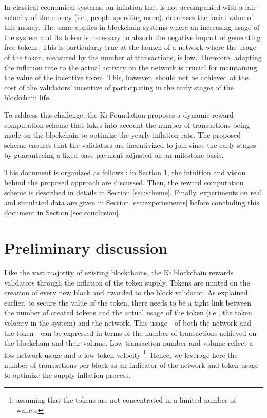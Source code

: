 \documentclass[]{article}
\begin{document}
In classical economical systems, an inflation that is not accompanied with a fair velocity of the money (i.e., people spending more), decreases the facial value of this money. The same applies in blockchain systems where an increasing usage of the system and its token is necessary to absorb the negative impact of generating free tokens. This is particularly true at the launch of a network where the usage of the token, measured by the number of transactions, is low. Therefore, adapting the inflation rate to the actual activity on the network is crucial for maintaining the value of the incentive token. This, however, should not be  achieved at the cost of the validators' incentive of participating in the early stages of the blockchain life.

To address this challenge, the Ki Foundation proposes a dynamic reward computation scheme that takes into account the number of transactions being made on the blockchain to optimize the yearly inflation rate. The proposed scheme ensures that the validators are incentivized to join since the early stages by guaranteeing a fixed base payment adjusted on an milestone basis.

This document is organized as follows :  in Section \ref{sec:discussion}, the intuition and vision behind the proposed approach are discussed. Then, the reward computation scheme is described in details in Section \ref{sec:scheme}. Finally, experiments on real and simulated data are given in Section \ref{sec:experiements} before concluding this document in Section \ref{sec:conclusion}.

\section{Preliminary discussion}
\label{sec:discussion}
Like the vast majority of existing blockchains, the Ki blockchain rewards validators through the inflation of the token supply. Tokens are minted on the creation of every new block and awarded to the block validator. As explained earlier, to secure the value of the token, there needs to be a tight link between the number of created tokens and the actual usage of the token (i.e., the token velocity in the system) and the network. This usage - of both the network and the token - can be expressed in terms of the number of transactions achieved on the blockchain and their volume. Low transaction number and volume reflect a low network usage and a low token velocity \footnote{assuming that the tokens are not concentrated in a limited number of wallets}. Hence, we leverage here the number of transactions per block as an indicator of the network and token usage to optimize the  supply inflation process.
\end{document}
